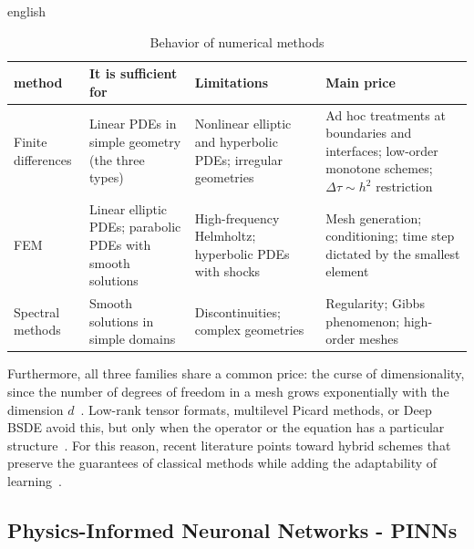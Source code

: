 \documentclass[../0000.tex]{subfiles}
\begin{document}
\begin{hyphenrules}{english}
\begin{table}[ht]
\centering\small
\caption{Behavior of numerical methods}
\label{tab:cruce-clasicos}
\begin{tabularx}{\textwidth}{@{}l >{\raggedright\arraybackslash}X >{\raggedright\arraybackslash}X >{\raggedright\arraybackslash}X@{}}
\toprule
method & It is sufficient for & Limitations & Main price \\
\midrule
Finite differences & Linear PDEs in simple geometry (the three types) & Nonlinear elliptic and hyperbolic PDEs; irregular geometries & Ad hoc treatments at boundaries and interfaces; low-order monotone schemes; $\Delta \tau \sim h^2$ restriction \\
FEM & Linear elliptic PDEs; parabolic PDEs with smooth solutions & High-frequency Helmholtz; hyperbolic PDEs with shocks & Mesh generation; conditioning; time step dictated by the smallest element \\
Spectral methods & Smooth solutions in simple domains & Discontinuities; complex geometries & Regularity; Gibbs phenomenon; high-order meshes \\
\bottomrule
\end{tabularx}
\end{table}

Furthermore, all three families share a common price: the curse of dimensionality, since the number of degrees of freedom in a mesh grows exponentially with the 
dimension $d$~\cite{alkhatib2025numerical,nooraiepour2026partial}. Low-rank tensor formats, multilevel Picard methods, or Deep BSDE avoid this, but only when the 
operator or the equation has a particular structure~\cite{bachmayr2023low,dahmen2016tensor,weinan2021algorithms}. For this reason, recent literature points toward 
hybrid schemes that preserve the guarantees of classical methods while adding the adaptability of learning~\cite{nooraiepour2026partial}.

\subsection{Physics-Informed Neuronal Networks - PINNs}


\end{hyphenrules}
\end{document}
